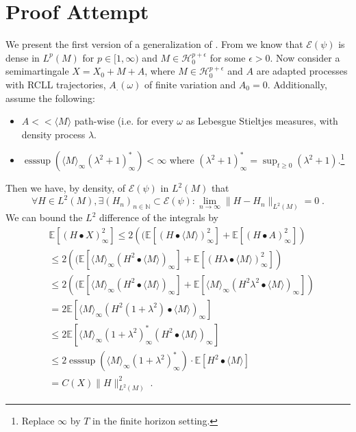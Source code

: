 \documentclass[11pt]{report}
\theoremstyle{plain} %
\theoremstyle{definition} %
\theoremstyle{remark} %
\begin{document}
\section{Proof Attempt}
We present the first version of a generalization of \parencite[Thm~5.35]{Arandjelovic2025}. From \parencite[Thm.~5.32.]{Arandjelovic2025} we know that \(\mathcal{E}(\psi)\) is dense in \(L^p(M)\) for \(p\in[1,\infty)\) and \(M\in\mathcal{H}_0^{p+\epsilon}\) for some \(\epsilon>0\). 
Now consider a semimartingale \(X=X_0+M+A\), where \(M\in\mathcal{H}_0^{p+\epsilon}\) and \(A\) are adapted processes with RCLL trajectories, \(A_.(\omega)\) of finite variation and \(A_0=0\). Additionally, assume the following:
\begin{itemize}
    \item \(A<<\langle M\rangle\) path-wise (i.e. for every \(\omega\) as Lebesgue Stieltjes measures, with density process \(\lambda\).
    \item \(\operatorname*{ess\sup}\left(\langle M\rangle_{\infty}(\lambda^2+1)^*_{\infty}\right)<\infty\) where \((\lambda^2+1)^*_{\infty}=\sup_{t\geq 0}(\lambda^2+1)\).\footnote{Replace \(\infty\) by \(T\) in the finite horizon setting.}
\end{itemize}
Then we have, by density, of \(\mathcal{E}(\psi)\) in \(L^2(M)\) that
\begin{equation}
    \forall H\in L^2(M), \exists (H_n)_{n\in\mathbb{N}}\subset\mathcal{E}(\psi):\lim_{n\to\infty}\lVert H-H_n\rVert_{L^2(M)}=0\;.
\end{equation}
We can bound the \(L^2\) difference of the integrals by 
\begin{align}
    &\mathbb{E}[(H\bullet X)_{\infty}^2]\leq 2\left((\mathbb{E}[(H\bullet \langle M\rangle)_{\infty}^2]+\mathbb{E}[(H\bullet A)_{\infty}^2]\right)\\
    &\leq 2\left((\mathbb{E}[\langle M\rangle_{\infty}(H^2\bullet \langle M\rangle)_{\infty}]+\mathbb{E}[(H\lambda\bullet \langle M\rangle)_{\infty}^2]\right)\\
    &\leq2\left((\mathbb{E}[\langle M\rangle_{\infty}(H^2\bullet \langle M\rangle)_{\infty}]+\mathbb{E}[\langle M\rangle_{\infty}(H^2\lambda^2\bullet \langle M\rangle)_{\infty}]\right)\\
    &=2\mathbb{E}[\langle M\rangle_{\infty}(H^2(1+\lambda^2)\bullet\langle M\rangle)_{\infty}]\\
    &\leq 2\mathbb{E}[\langle M\rangle_{\infty}(1+\lambda^2)^{*}_{\infty}(H^2\bullet\langle M\rangle)_{\infty}]\\
    &\leq2\operatorname*{ess\sup}(\langle M\rangle_{\infty}(1+\lambda^2)^{*}_{\infty})\cdot\mathbb{E}[H^2\bullet \langle M\rangle]\\
    &=C(X)\lVert H\rVert_{L^2(M)}^2\;.
\end{align}
\end{document}
